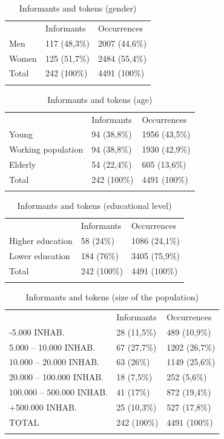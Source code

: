 \documentclass[output=paper]{LSP/langsci}
\begin{document}
\begin{table}
\begin{tabular}{lll} & Informants & Occurrences\\
\lsptoprule
Men & 117 (48,3\%) & 2007 (44,6\%)\\
Women & 125 (51,7\%) & 2484 (55,4\%)\\
Total & 242 (100\%) & 4491 (100\%)\\
\lspbottomrule
\end{tabular}
\label{tab:4}
\caption{Informants and tokens (gender)}
\end{table}

\begin{table}
\begin{tabular}{lll} & Informants & Occurrences\\
\lsptoprule
Young & 94 (38,8\%) & 1956 (43,5\%)\\
Working population & 94 (38,8\%) & 1930 (42,9\%)\\
Elderly & 54 (22,4\%) & 605 (13,6\%)\\
Total & 242 (100\%) & 4491 (100\%)\\
\lspbottomrule
\end{tabular}
\label{tab:5}
\caption{Informants and tokens (age)}
\end{table}

\begin{table}
\begin{tabular}{lll} & Informants & Occurrences\\
\lsptoprule
Higher education & 58 (24\%) & 1086 (24,1\%)\\
Lower education & 184 (76\%) & 3405 (75,9\%)\\
Total & 242 (100\%) & 4491 (100\%)\\
\lspbottomrule
\end{tabular}
\label{tab:6}
\caption{Informants and tokens (educational level)}
\end{table}

\begin{table}
\begin{tabular}{lll} & Informants & Occurrences\\
\lsptoprule
{}-5.000 INHAB. & 28 (11,5\%) & 489 (10,9\%)\\
5.000 – 10.000 INHAB. & 67 (27,7\%) & 1202 (26,7\%)\\
10.000 – 20.000 INHAB. & 63 (26\%) & 1149 (25,6\%)\\
20.000 – 100.000 INHAB. & 18 (7,5\%) & 252 (5,6\%)\\
100.000 – 500.000 INHAB. & 41 (17\%) & 872 (19,4\%)\\
+500.000 INHAB. & 25 (10,3\%) & 527 (17,8\%)\\
TOTAL & 242 (100\%) & 4491 (100\%)\\
\lspbottomrule
\end{tabular}
\label{tab:7}
\caption{Informants and tokens (size of the population)}
\end{table}
\end{document}
